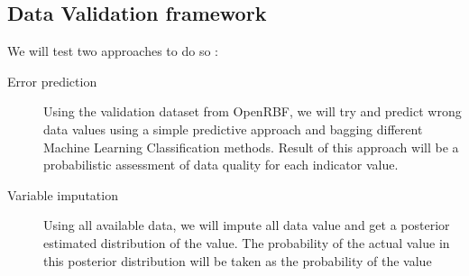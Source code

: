 




\subsection{Data Validation framework}


We will test two approaches to do so :

\begin{description}
\item[Error prediction] Using the validation dataset from OpenRBF, we will try and predict wrong data values using a simple predictive approach and bagging different Machine Learning Classification methods. Result of this approach will be a probabilistic assessment of data quality for each indicator value.
\item[Variable imputation] Using all available data, we will impute all data value and get a posterior estimated distribution of the value. The probability of the actual value in this posterior distribution will be taken as the probability of the value
\end{description}


